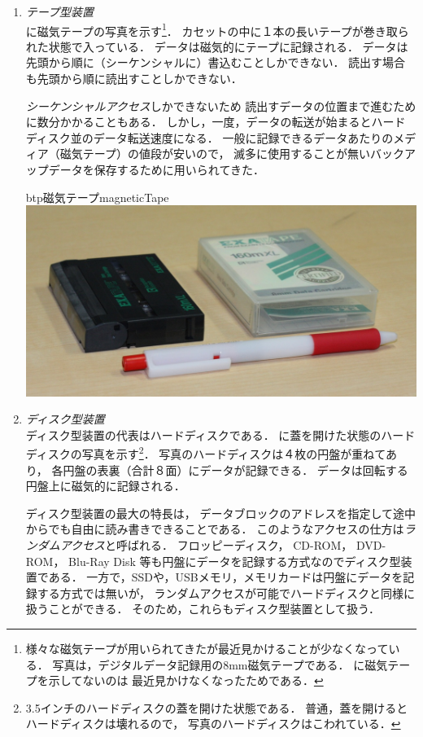 \begin{enumerate}
\item \emph{テープ型装置}\\
  に磁気テープの写真を示す\footnote{
    様々な磁気テープが用いられてきたが最近見かけることが少なくなっている．
    写真は，デジタルデータ記録用の8mm磁気テープである．
    に磁気テープを示してないのは
    最近見かけなくなったためである．
  }．
  カセットの中に１本の長いテープが巻き取られた状態で入っている．
  データは磁気的にテープに記録される．
  データは先頭から順に（シーケンシャルに）書込むことしかできない．
  読出す場合も先頭から順に読出すことしかできない．

  \emph{シーケンシャルアクセス}しかできないため
  読出すデータの位置まで進むために数分かかることもある．
  しかし，一度，データの転送が始まるとハードディスク並のデータ転送速度になる．
  一般に記録できるデータあたりのメディア（磁気テープ）の値段が安いので，
  滅多に使用することが無いバックアップデータを保存するために用いられてきた．

  \begin{myfig}{btp}{磁気テープ}{magneticTape}
    \includegraphics[scale=0.3]{Fig/magneticTape.jpg}
  \end{myfig}

\item \emph{ディスク型装置} \\
  ディスク型装置の代表はハードディスクである．
  に蓋を開けた状態のハードディスクの写真を示す\footnote{
    3.5インチのハードディスクの蓋を開けた状態である．
    普通，蓋を開けるとハードディスクは壊れるので，
    写真のハードディスクはこわれている．}．
  写真のハードディスクは４枚の円盤が重ねてあり，
  各円盤の表裏（合計８面）にデータが記録できる．
  データは回転する円盤上に磁気的に記録される．

  ディスク型装置の最大の特長は，
  データブロックのアドレスを指定して途中からでも自由に読み書きできることである．
  このようなアクセスの仕方は\emph{ランダムアクセス}と呼ばれる．
  フロッピーディスク，
  CD-ROM，
  DVD-ROM，
  Blu-Ray Disk 等も円盤にデータを記録する方式なのでディスク型装置である．
  一方で，SSDや，USBメモリ，メモリカードは円盤にデータを記録する方式では無いが，
  ランダムアクセスが可能でハードディスクと同様に扱うことができる．
  そのため，これらもディスク型装置として扱う．


\end{enumerate}
